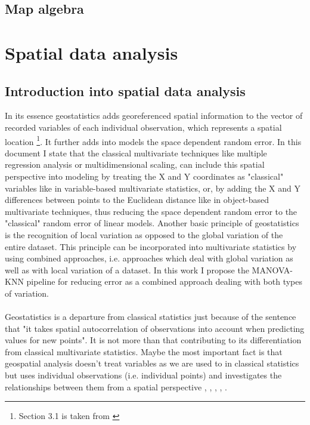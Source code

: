 \documentclass {article}
\begin{document}
\subsection {Map algebra}



\section {Spatial data analysis}

\subsection{Introduction into spatial data analysis}

In its essence geostatistics adds georeferenced spatial information to the vector of recorded variables of each individual observation, which represents a spatial location \footnote {Section 3.1 is taken from \cite{tesileanu_geostatistics_2017}}.
 It further adds into models the space dependent random error. 
In this document I state that the classical multivariate techniques like multiple regression analysis or multidimensional scaling, can include this spatial perspective into modeling by treating the X and Y coordinates as "classical" variables like in variable-based multivariate statistics, or, by adding the X and Y differences between points to the Euclidean distance like in object-based multivariate techniques, thus reducing the space dependent random error to the "classical" random error of linear models.   
Another basic principle of geostatistics is the recognition of local variation as opposed to the global variation of the entire dataset. 
This principle can be incorporated into multivariate statistics by using combined approaches, i.e. approaches which deal with global variation as well as with local variation of a dataset.
In this work I propose the MANOVA-KNN pipeline \cite{tesileanu_introduction_2017} for reducing error as a combined approach dealing with both types of variation.
\\
\\
Geostatistics is a departure from classical statistics just because of the sentence that "it takes spatial autocorrelation of observations into account when predicting values for new points". It is not more than that contributing to its differentiation from classical multivariate statistics.
Maybe the most important fact is that geospatial analysis doesn't treat variables as we are used to in classical statistics but uses individual observations (i.e. individual points) and investigates the relationships between them from a spatial perspective \cite{cressie_statistics_1993}, \cite{webster_geostatistics_2007}, \cite{isaaks_applied_1989}, \cite{hengl_practical_2009}, \cite{johnston_using_2003}.
\end{document}
